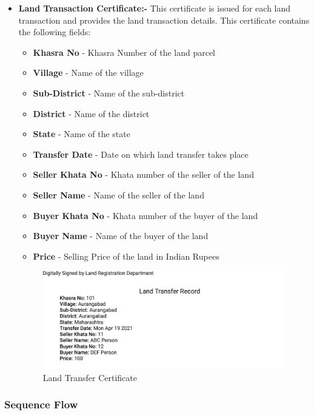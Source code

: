 \documentclass[12pt]{article}
\begin{document}
\begin{itemize}
            \item \textbf{Land Transaction Certificate:-}  This certificate is issued for each land transaction and provides the land transaction details. This certificate contains the following fields:
             \begin{itemize}
                \item \textbf{Khasra No} - Khasra Number of the land parcel
                \item \textbf{Village} - Name of the village
                \item \textbf{Sub-District} - Name of the sub-district 
                \item \textbf{District} - Name of the district
                \item \textbf{State} - Name of the state
                \item \textbf{Transfer Date} - Date on which land transfer takes place
                \item \textbf{Seller Khata No} - Khata number of the seller of the land
                \item \textbf{Seller Name} - Name of the seller of the land
                \item \textbf{Buyer Khata No} - Khata number of the buyer of the land
                \item \textbf{Buyer Name} - Name of the buyer of the land
                \item \textbf{Price} - Selling Price of the land in Indian Rupees
            \end{itemize}
            \begin{figure}[H]
                \includegraphics[scale=0.3, frame]{landtransfercertificate.png}
                \centering
                \caption{Land Transfer Certificate}
            \end{figure}
        \end{itemize}
        
        \subsubsection{Sequence Flow}
\end{document}
